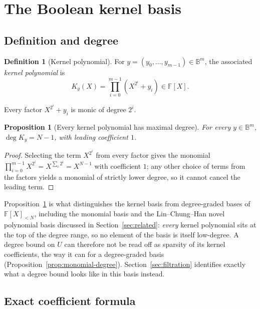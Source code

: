\documentclass[preprint,3p,12pt,numbers]{elsarticle}
\newtheorem{proposition}[theorem]{Proposition}
\theoremstyle{definition}
\newtheorem{definition}[theorem]{Definition}
\theoremstyle{remark}
\begin{document}
\section{The Boolean kernel basis}
\label{sec:basis}

\subsection{Definition and degree}
\label{subsec:def-degree}

\begin{definition}[Kernel polynomial]
\label{def:kernel}
For $y = (y_0,\dots,y_{m-1}) \in \mathbb{B}^m$, the associated
\emph{kernel polynomial} is
\[
  K_y(X) = \prod_{i=0}^{m-1} \left( X^{2^i} + y_i \right) \in \mathbb{F}[X].
\]
\end{definition}

Every factor $X^{2^i}+y_i$ is monic of degree $2^i$.

\begin{proposition}[Every kernel polynomial has maximal degree]
\label{prop:kernel-degree}
For every $y \in \mathbb{B}^m$, $\deg K_y = N-1$, with leading coefficient
$1$.
\end{proposition}

\begin{proof}
Selecting the term $X^{2^i}$ from every factor gives the monomial
$\prod_{i=0}^{m-1} X^{2^i} = X^{\sum_i 2^i} = X^{N-1}$ with coefficient
$1$; any other choice of terms from the factors yields a monomial of
strictly lower degree, so it cannot cancel the leading term.
\end{proof}

Proposition~\ref{prop:kernel-degree} is what distinguishes the kernel basis
from degree-graded bases of $\mathbb{F}[X]_{<N}$, including the monomial
basis and the Lin--Chung--Han novel polynomial basis discussed in
Section~\ref{sec:related}: \emph{every} kernel polynomial sits at the top
of the degree range, so no element of the basis is itself low-degree. A
degree bound on $U$ can therefore not be read off as sparsity of its kernel
coefficients, the way it can for a degree-graded basis
(Proposition~\ref{prop:monomial-degree}). Section~\ref{sec:filtration}
identifies exactly what a degree bound looks like in this basis instead.

\subsection{Exact coefficient formula}
\label{subsec:coeff-formula}
\end{document}
